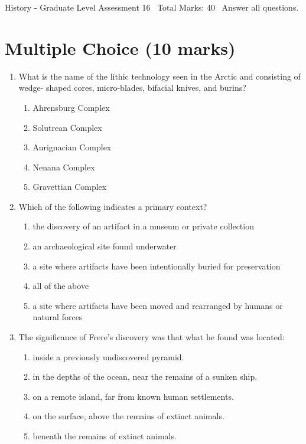 \documentclass[12pt]{article}
\begin{document}
\begin{center}
History - Graduate Level Assessment 16 \
Total Marks: 40 \
Answer all questions.
\end{center}

\section*{Multiple Choice (10 marks)}
\begin{enumerate}[label=\arabic*.]
\item What is the name of the lithic technology seen in the Arctic and consisting of wedge- shaped cores, micro-blades, bifacial knives, and burins?
\begin{enumerate}[label=(\alph*)]
    \item Ahrensburg Complex
    \item Solutrean Complex
    \item Aurignacian Complex
    \item Nenana Complex
    \item Gravettian Complex
\end{enumerate}
\item Which of the following indicates a primary context?
\begin{enumerate}[label=(\alph*)]
    \item the discovery of an artifact in a museum or private collection
    \item an archaeological site found underwater
    \item a site where artifacts have been intentionally buried for preservation
    \item all of the above
    \item a site where artifacts have been moved and rearranged by humans or natural forces
\end{enumerate}
\item The significance of Frere's discovery was that what he found was located:
\begin{enumerate}[label=(\alph*)]
    \item inside a previously undiscovered pyramid.
    \item in the depths of the ocean, near the remains of a sunken ship.
    \item on a remote island, far from known human settlements.
    \item on the surface, above the remains of extinct animals.
    \item beneath the remains of extinct animals.

\end{enumerate}
\end{enumerate}
\end{document}
